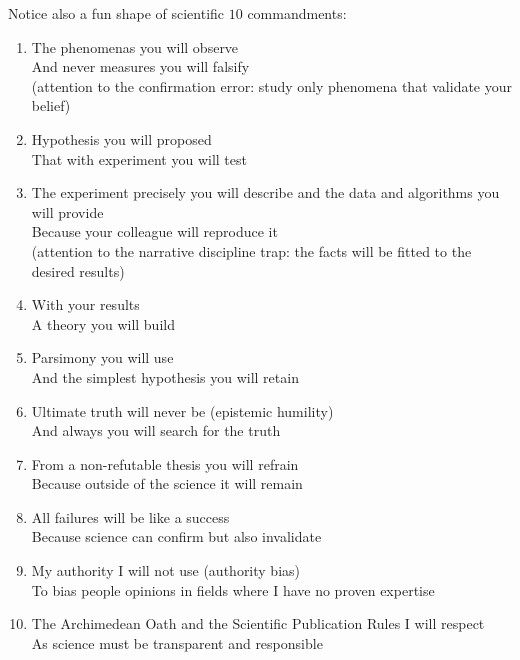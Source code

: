 Notice also a fun shape of scientific $10$ commandments:
\begin{enumerate}
\item The phenomenas you will observe\\
And never measures you will falsify\\
(attention to the confirmation error: study only phenomena that validate your belief)

\item Hypothesis you will proposed\\
That with experiment you will test

\item The experiment precisely you will describe and the data and algorithms you will provide\\
Because your colleague will reproduce it\\
(attention to the narrative discipline trap: the facts will be fitted to the desired results)

\item With your results\\
A theory you will build

\item Parsimony you will use\\
And the simplest hypothesis you will retain

\item Ultimate truth will never be (epistemic humility)\\
And always you will search for the truth

\item From a non-refutable thesis you will refrain\\
Because outside of the science it will remain

\item All failures will be like a success\\
Because science can confirm but also invalidate

\item My authority I will not use (authority bias)\\
To bias people opinions in fields where I have no proven expertise

\item The Archimedean Oath and the Scientific Publication Rules I will respect\\
As science must be transparent and responsible
\end{enumerate}

